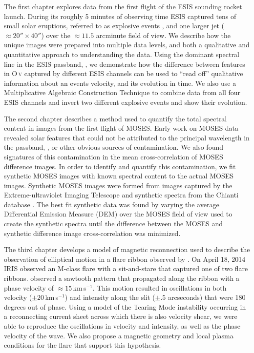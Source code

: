The first chapter explores data from the first flight of the ESIS sounding rocket launch. 
During its roughly 5 minutes of observing time ESIS captured tens of small solar eruptions, referred to as explosive events \citep{Dere1989}, and one larger jet ($\approx 20''\times40''$) over the $\approx11.5$ arcminute field of view.
We describe how the unique images were prepared into multiple data levels, and both a qualitative and quantitative approach to understanding the data.
Using the dominant spectral line in the ESIS passband, , we demonstrate how the difference between features in O\,\textsc{v} captured by different ESIS channels can be used to ``read off'' qualitative information about an events velocity, and its evolution in time.
We also use a Multiplicative Algebraic Construction Technique \citep[MART:][]{Okamoto1991,Verhoeven1993} to combine data from all four ESIS channels and invert two different explosive events and show their evolution.

The second chapter describes a method used to quantify the total spectral content in images from the first flight of MOSES.
Early work on MOSES data revealed solar features that could not be attributed to the principal wavelength in the passband, , or other obvious sources of contamination. 
We also found signatures of this contamination in the mean cross-correlation of MOSES difference images.
In order to identify and quantify this contamination, we fit synthetic MOSES images with known spectral content to the actual MOSES images.
Synthetic MOSES images were formed from images captured by the Extreme-ultraviolet Imaging Telescope \citep[EIT:][]{EIT} and synthetic spectra from the Chianti database \citep{ChiantiI,ChiantiX}.
The best fit synthetic data was found by varying the average Differential Emission Measure (DEM) over the MOSES field of view used to create the synthetic spectra until the difference between the MOSES and synthetic difference image cross-correlation was minimized.

The third chapter develops a model of magnetic reconnection used to describe the observation of elliptical motion in a flare ribbon observed by \citet{Brannon2015}.
On April 18, 2014 IRIS observed an M-class flare with a sit-and-stare that captured one of two flare ribbons.
\citet{Brannon2015} observed a sawtooth pattern that propagated along the ribbon with a phase velocity of $\approx15$\,km\,s$^{-1}$.
This motion resulted in oscillations in both velocity ($\pm20$\,km\,s$^{-1}$) and intensity along the slit ($\pm.5$ arcseconds) that were 180 degrees out of phase.
Using a model of the Tearing Mode instability \citep{FKR} occurring in a reconnecting current sheet across which there is also velocity shear, we were able to reproduce the oscillations in velocity and intensity, as well as the phase velocity of the wave.
We also propose a magnetic geometry and local plasma conditions for the flare that support this hypothesis.








